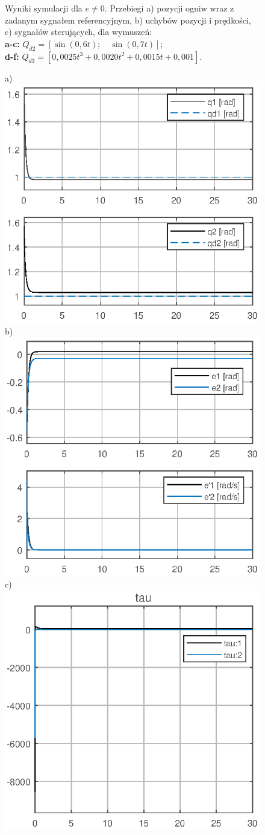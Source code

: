 \documentclass[12pt, a4paper, polish]{article}
\begin{document}
\begin{figure}[H]
{		Wyniki symulacji dla  $e\neq0$. Przebiegi a) pozycji ogniw wraz z zadanym sygnałem referencyjnym, b) uchybów pozycji i prędkości, c)  sygnałów sterujących, dla wymuszeń:\\
		\textbf{a-c:} $Q_{d2}=[\sin(0,6t);\quad \sin(0,7t)]$;\\
		\textbf{d-f:} $Q_{d3}=[0,0025t^3+0,0020t^2+0,0015t+0,001]$.}
\end{figure}
	\begin{figure}[H]\centering
	a) \includegraphics[width=0.30\columnwidth]{SRManCw5/SRManCw5_ZADANIE2/figs/04Pozycje} b)\includegraphics[width=0.30\columnwidth]{SRManCw5/SRManCw5_ZADANIE2/figs/04Uchyby} c)\includegraphics[width=0.30\columnwidth]{SRManCw5/SRManCw5_ZADANIE2/figs/04Sygnal}\\

\end{figure}
\end{document}
